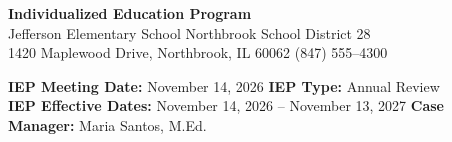 \documentclass[11pt]{article}
\begin{document}
\confidentialmark
\vspace{8pt}

{\centering
{\Huge\bfseries\color{IEPNavy} Individualized Education Program}\\[4pt]
{\Large\color{IEPTeal} Jefferson Elementary School \hspace{1.5em} Northbrook School District 28}\\[2pt]
{\normalsize\color{IEPGray} 1420 Maplewood Drive, Northbrook, IL 60062 \quad\faPhone\enspace (847) 555--4300}
\par}

\vspace{10pt}

\begin{iepbox}
{\bfseries\color{IEPNavy} IEP Meeting Date:} November 14, 2026 \hfill
{\bfseries\color{IEPNavy} IEP Type:} Annual Review\\[2pt]
{\bfseries\color{IEPNavy} IEP Effective Dates:} November 14, 2026 -- November 13, 2027 \hfill
{\bfseries\color{IEPNavy} Case Manager:} Maria Santos, M.Ed.
\end{iepbox}

\vspace{6pt}











\end{document}
